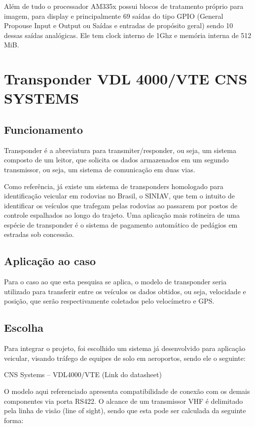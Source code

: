 Além de tudo o processador AM335x possui blocos de tratamento próprio para imagem, para display e principalmente 69 saídas do tipo GPIO (General Propouse Input e Output ou Saídas e entradas de propósito geral) sendo 10 dessas saídas analógicas. Ele tem clock interno de 1Ghz e memória interna de 512 MiB.

\section{Transponder VDL 4000/VTE CNS SYSTEMS}

\subsection{Funcionamento}

Transponder é a abreviatura para transmiter/responder, ou seja, um sistema composto de um leitor, que solicita os dados armazenados em um segundo transmissor, ou seja, um sistema de comunicação em duas vias.

Como referência, já existe um sistema de transponders homologado para identificação veicular em rodovias no Brasil, o SINIAV, que tem o intuito de identificar os veículos que trafegam pelas rodovias ao passarem por postos de controle espalhados ao longo do trajeto. Uma aplicação mais rotineira de uma espécie de transponder é o sistema de pagamento automático de pedágios em estradas sob concessão.

\subsection{Aplicação ao caso}

Para o caso ao que esta pesquisa se aplica, o modelo de transponder seria utilizado para transferir entre os veículos os dados obtidos, ou seja, velocidade e posição, que serão respectivamente coletados pelo velocímetro e GPS. 

\subsection{Escolha}

Para integrar o projeto, foi escolhido um sistema já desenvolvido para aplicação veicular, visando tráfego de equipes de solo em aeroportos, sendo ele o seguinte:

CNS Systems – VDL4000/VTE (Link do datasheet)

O modelo aqui referenciado apresenta compatibilidade de conexão com os demais componentes via porta RS422. O alcance de um transmissor VHF é delimitado pela linha de visão (line of sight), sendo que esta pode ser calculada da seguinte forma:

